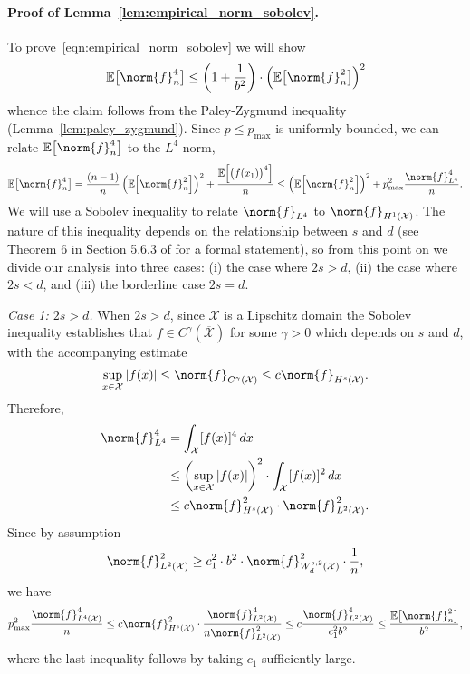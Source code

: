 \documentclass{article}
\newcommand{\abs}[1]{\left \lvert #1 \right \rvert}
\newcommand{\1}{\mathbf{1}}
\newcommand{\Xset}{\mathcal{X}}
\newcommand{\Leb}{L}
\newcommand{\Ebb}{\mathbb{E}}
\theoremstyle{alden}
\theoremstyle{aldenthm}
\theoremstyle{definition}
\theoremstyle{remark}
\begin{document}
\paragraph{Proof of Lemma~\ref{lem:empirical_norm_sobolev}.}
To prove~\eqref{eqn:empirical_norm_sobolev} we will show
\begin{equation*}
\mathbb{E}\bigl[\norm{f}_n^4\bigr] \leq \left(1 + \frac{1}{b^2}\right)\cdot \left(\mathbb{E}\bigl[\norm{f}_n^2\bigr]\right)^2
\end{equation*}
whence the claim follows from the Paley-Zygmund inequality (Lemma~\ref{lem:paley_zygmund}). Since $p \leq p_{\max}$ is uniformly bounded, we can relate $\mathbb{E}\bigl[\norm{f}_n^4\bigr]$ to the $\Leb^4$ norm,
\begin{equation*}
\mathbb{E}\bigl[\norm{f}_n^4\bigr] = \frac{(n-1)}{n}\left(\mathbb{E}\Bigl[\norm{f}_n^2\Bigr]\right)^2 + \frac{\mathbb{E}\Bigl[\bigl(f(x_1)\bigr)^4\Bigr]}{n} \leq \left(\mathbb{E}\Bigl[\norm{f}_n^2\Bigr]\right)^2 + p_{\max}^2\frac{\norm{f}_{\Leb^4}^4}{n}.
\end{equation*}
We will use a Sobolev inequality to relate $\norm{f}_{\Leb^4}$ to $\norm{f}_{H^1(\Xset)}$. The nature of this inequality depends on the relationship between $s$ and $d$ (see Theorem 6 in Section 5.6.3 of \cite{evans10} for a formal statement), so from this point on we divide our analysis into three cases: (i) the case where $2s > d$, (ii) the case where $2s < d$, and (iii) the borderline case $2s = d$.

\textit{Case 1: $2s > d$.}
When $2s > d$, since $\Xset$ is a Lipschitz domain the Sobolev inequality establishes that $f \in C^{\gamma}(\overline{\Xset})$ for some $\gamma > 0$ which depends on $s$ and $d$, with the accompanying estimate
\begin{equation*}
\sup_{x \in \Xset} \abs{f(x)} \leq \norm{f}_{C^{\gamma}(\Xset)} \leq c \norm{f}_{H^s(\Xset)}.
\end{equation*}
Therefore,
\begin{align*}
\norm{f}_{\Leb^4}^4 & = \int_{\Xset} [f(x)]^4 \,dx \\
& \leq \left(\sup_{x \in \Xset} \abs{f(x)}\right)^2 \cdot \int_{\Xset} [f(x)]^2 \,dx \\
& \leq c \norm{f}_{H^s(\Xset)}^2 \cdot \norm{f}_{\Leb^2(\Xset)}^2.
\end{align*}
Since by assumption
\begin{equation*}
\norm{f}_{\Leb^2(\Xset)}^2 \geq c_1^2 \cdot b^2 \cdot \norm{f}_{W_d^{s,2}(\Xset)}^2 \cdot \frac{1}{n},
\end{equation*}
we have
\begin{equation*}
p_{\max}^2\frac{\norm{f}_{\Leb^4(\Xset)}^4}{n} \leq c \norm{f}_{H^s(\Xset)}^2 \cdot \frac{\norm{f}_{\Leb^2(\Xset)}^4}{n \norm{f}_{\Leb^2(\Xset)}^2} \leq c \frac{\norm{f}_{\Leb^2(\Xset)}^4}{c_1^2 b^2} \leq \frac{\Ebb\bigl[\norm{f}_n^2\bigr]}{b^2},
\end{equation*}
where the last inequality follows by taking $c_1$ sufficiently large.
\end{document}
